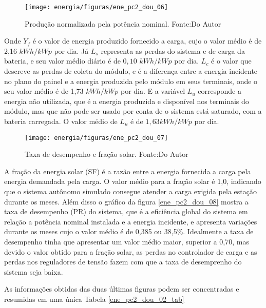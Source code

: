 \begin{figure}[H]
		\centering
		\texttt{[image: energia/figuras/ene\_pc2\_dou\_06]}
		\caption{Produção normalizada pela potência nominal. Fonte:Do Autor}
		\label{ene_pc2_dou_06}
\end{figure}

Onde $Y_f$ é o valor de energia produzido fornecido a carga, cujo o valor médio é de 2,16 $kWh/kWp$ por dia. Já $L_s$ representa as perdas do sistema e de carga da bateria, e seu valor médio diário é de $0,10$ $kWh/kWp$ por dia.  $L_c$ é o valor que descreve as perdas de coleta do módulo, e é a diferença entre a energia incidente no plano do painel e a energia produzida pelo módulo em seus terminais, onde o seu valor médio é de 1,73 $kWh/kWp$ por dia. E a variável $L_u$ corresponde a energia não utilizada, que é a energia produzida e disponível nos terminais do módulo, mas que não pode ser usado por conta de o sistema está saturado, com a bateria carregada. O valor médio de $L_u$ é de $1,63 kWh/kWp$ por dia.

\begin{figure}[H]
		\centering
		\texttt{[image: energia/figuras/ene\_pc2\_dou\_07]}
		\caption{Taxa de desempenho e fração solar. Fonte:Do Autor}
		\label{ene_pc2_dou_07}
\end{figure}

A fração da energia solar (SF) é a razão entre a energia fornecida a carga pela energia demandada pela carga. O valor médio para a fração solar é 1,0, indicando que o sistema autônomo simulado consegue atender a carga exigida pela estação durante os meses. Além disso o gráfico da figura \ref{ene_pc2_dou_08} mostra a taxa de desempenho (PR) do sistema, que é a eficiência global do sistema em relação a potência nominal instalada e a energia incidente, e apresenta variações durante os meses cujo o valor médio é de 0,385 ou 38,5\%. Idealmente a taxa de desempenho tinha que apresentar um valor médio maior, superior a 0,70, mas devido o valor obtido para a fração solar, as perdas no controlador de carga e as perdas nos reguladores de tensão fazem com que a taxa de desemprenho do sistema seja baixa.

	As informações obtidas das duas últimas figuras podem ser concentradas e resumidas em uma única Tabela \ref{ene_pc2_dou_02_tab}
	
\begin{table}[H]
\caption{Principais resultados da simulação. Fonte do Autor}
\label{ene_pc2_dou_02_tab}
\end{table}

